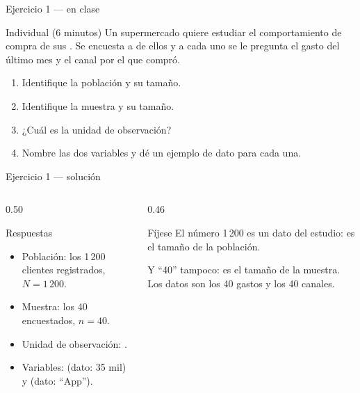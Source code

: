 \documentclass[aspectratio=169,10pt]{beamer}
\begin{document}
\begin{frame}{Ejercicio 1 — en clase}
  \begin{alertblock}{Individual (6 minutos)}
    Un supermercado quiere estudiar el comportamiento de compra de sus
    . Se encuesta a  de
    ellos y a cada uno se le pregunta el gasto del último mes y el canal por el
    que compró.

    \vspace{0.3cm}
    \begin{enumerate}
      \item Identifique la población y su tamaño.
      \item Identifique la muestra y su tamaño.
      \item ¿Cuál es la unidad de observación?
      \item Nombre las dos variables y dé un ejemplo de dato para cada una.
    \end{enumerate}
  \end{alertblock}
\end{frame}

\begin{frame}{Ejercicio 1 — solución}
  \begin{columns}[T,onlytextwidth]
    \begin{column}{0.50\textwidth}
      \begin{block}{Respuestas}
        \footnotesize
        \begin{itemize}
          \item Población: los 1\,200 clientes registrados, $N=1\,200$.
          \item Muestra: los 40 encuestados, $n=40$.
          \item Unidad de observación: .
          \item Variables:  (dato: 35 mil) y  (dato: ``App'').
        \end{itemize}
      \end{block}
    \end{column}
    \begin{column}{0.46\textwidth}
      \begin{exampleblock}{Fíjese}
        \footnotesize
        El número 1\,200  es un dato del estudio: es el tamaño de la
        población.

        \vspace{0.2cm}
        Y ``40'' tampoco: es el tamaño de la muestra. Los datos son los 40
        gastos y los 40 canales.
      \end{exampleblock}
    \end{column}
  \end{columns}
\end{frame}
\end{document}

